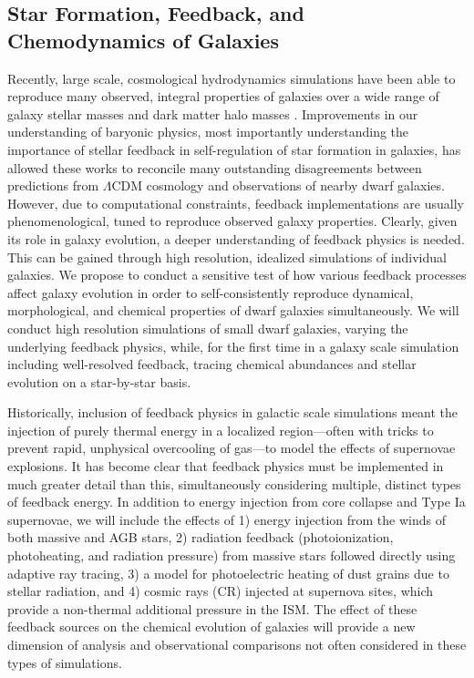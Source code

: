 \documentclass[11pt]{article}
\newcommand{\eg}{e.g.,}
\begin{document}
\subsection{Star Formation, Feedback, and Chemodynamics of Galaxies}

Recently, large scale, cosmological hydrodynamics simulations have been able to reproduce many observed, integral properties of galaxies over a wide range of galaxy stellar masses and dark matter halo masses \citep[\eg][]{MUGS2010, MAGICC2013, Illustris1, Illustris2, OWLS, EAGLE, FIRE, APOSTLE, Latte}. 
Improvements in our understanding of baryonic physics, most importantly understanding the importance of stellar feedback in self-regulation of star formation in galaxies, has allowed these works to reconcile many outstanding disagreements between predictions from $\Lambda$CDM cosmology and observations of nearby dwarf galaxies. However, due to computational constraints, feedback implementations are usually phenomenological, tuned to reproduce observed galaxy properties. Clearly, given its role in galaxy evolution, a deeper understanding of feedback physics is needed. This can be gained through high resolution, idealized simulations of individual galaxies. We propose to conduct a sensitive test of how various feedback processes affect galaxy evolution in order to self-consistently reproduce dynamical, morphological, and chemical properties of dwarf galaxies simultaneously. We will conduct high resolution simulations of small dwarf galaxies, varying the underlying feedback physics, while, for the first time in a galaxy scale simulation including well-resolved feedback, tracing chemical abundances and stellar evolution on a star-by-star basis.

Historically, inclusion of feedback physics in galactic scale simulations meant the injection of purely thermal energy in a localized region---often with tricks to prevent rapid, unphysical overcooling of gas---to model the effects of supernovae explosions. It has become clear that feedback physics must be implemented in much greater detail than this, simultaneously considering multiple, distinct types of feedback energy. In addition to energy injection from core collapse and Type Ia supernovae, we will include the effects of 1) energy injection from the winds of both massive and AGB stars, 2) radiation feedback (photoionization, photoheating, and radiation pressure) from massive stars followed directly using adaptive ray tracing, 3) a model for photoelectric heating of dust grains due to stellar radiation, and 4) cosmic rays (CR) injected at supernova sites, which provide a non-thermal additional pressure in the ISM. The effect of these feedback sources on the chemical evolution of galaxies will provide a new dimension of analysis and observational comparisons not often considered in these types of simulations.
\end{document}
